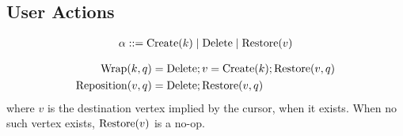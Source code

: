 
\subsection{User Actions}

\[
  \arraycolsep=0pt
  \begin{array}{llll}
    \alpha & {}::={} & \Create{k} \mid \Delete \mid \Restore{v} \\
  \end{array}
\]

\begin{align*}
  \Wrap{k, q} &= \Delete; v=\Create{k}; \Restore{v, q} \\
  \Reposition{v, q} &= \Delete; \Restore{v, q} \\
\end{align*}
%
where $v$ is the destination vertex implied by the cursor, when it exists.
When no such vertex exists, $\Restore{v}$ is a no-op.